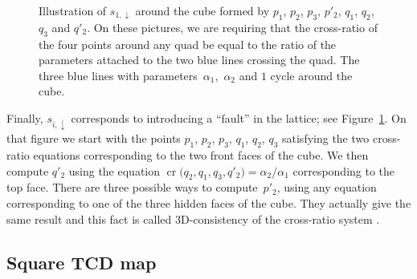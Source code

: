 \documentclass[10pt,a4paper]{amsart}
\numberwithin{equation}{section}
\def\cro{\operatorname{cr}}
\begin{document}
\begin{figure}[ht]
		\caption{Illustration of $s_{1,\downarrow}$ around the cube formed by $p_1$, $p_2$, $p_3$, $p'_2$, $q_1$, $q_2$, $q_3$ and $q'_2$. On these pictures, we are requiring that the cross-ratio of the four points around any quad be equal to the ratio of the parameters attached to the two blue lines crossing the quad. The three blue lines with parameters~$\alpha_1$,~$\alpha_2$ and $1$ cycle around the cube.}
		\label{fig:consistency}
	\end{figure}	
	
	Finally, $s_{i,\downarrow}$ corresponds to introducing a ``fault'' in the lattice; see Figure~\ref{fig:consistency}. On that figure we start with the points $p_1$, $p_2$, $p_3$, $q_1$, $q_2$, $q_3$ satisfying the two cross-ratio equations corresponding to the two front faces of the cube. We then compute $q'_2$ using the equation ${\cro\big(q_2,q_1,q_3,q'_2\big)=\alpha_2/\alpha_1}$ corresponding to the top face. There are three possible ways to compute~$p'_2$, using any equation corresponding to one of the three hidden faces of the cube. They actually give the same result and this fact is called 3D-consistency of the cross-ratio system \cite{bsintegrablequads}.
	
	\subsection{Square TCD map}\label{sec:sqtcd}
	
\end{document}
